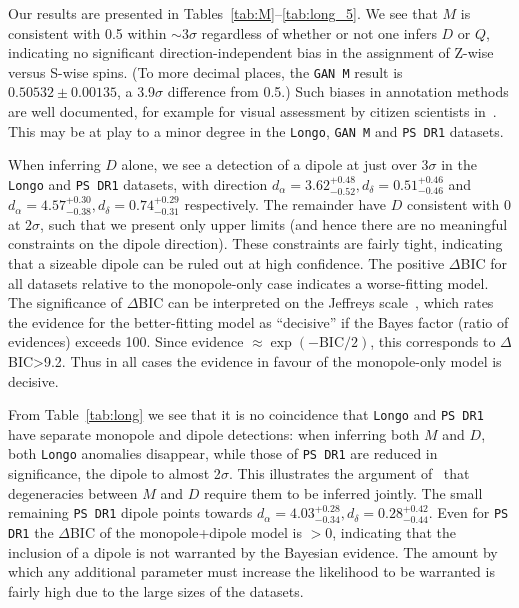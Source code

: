\documentclass[fleqn,usenatbib,nofootinbib]{mnras}
\newcommand{\hd}[1]{{\color{red}\textbf{HD: #1}}}
\begin{document}

Our results are presented in Tables~\ref{tab:M}--\ref{tab:long_5}. We see that $M$ is consistent with 0.5 within $\sim$3$\sigma$ regardless of whether or not one infers $D$ or $Q$, indicating no significant direction-independent bias in the assignment of Z-wise versus S-wise spins. (To more decimal places, the \texttt{GAN M} result is $0.50532\pm0.00135$, a 3.9$\sigma$ difference from 0.5.) Such biases in annotation methods are well documented, for example for visual assessment by citizen scientists in~\citet{Land, 2009MNRAS.392.1225S, 2017MNRAS.466.3928H}.
This may be at play to a minor degree in the \texttt{Longo}, \texttt{GAN M} and \texttt{PS DR1} datasets.

When inferring $D$ alone, we see a detection of a dipole at just over $3\sigma$ in the \texttt{Longo} and \texttt{PS DR1} datasets, with direction $d_{\alpha}=3.62^{+0.48}_{-0.52}, d_{\delta}=0.51^{+0.46}_{-0.46}$ and $d_{\alpha}=4.57^{+0.30}_{-0.38}, d_{\delta}=0.74^{+0.29}_{-0.31}$ respectively. The remainder have $D$ consistent with 0 at $2\sigma$, such that we present only upper limits (and hence there are no meaningful constraints on the dipole direction). These constraints are fairly tight, indicating that a sizeable dipole can be ruled out at high confidence. The positive $\Delta$BIC for all datasets relative to the monopole-only case indicates a worse-fitting model. The significance of $\Delta$BIC can be interpreted on the Jeffreys scale~\citep{Jeffreys}, which rates the evidence for the better-fitting model as ``decisive'' if the Bayes factor (ratio of evidences) exceeds 100. Since evidence $\approx\exp(-\text{BIC}/2)$, this corresponds to $\Delta$BIC>9.2. Thus in all cases the evidence in favour of the monopole-only model is decisive.

From Table~\ref{tab:long} we see that it is no coincidence that \texttt{Longo} and \texttt{PS DR1} have separate monopole and dipole detections: when inferring both $M$ and $D$, both \texttt{Longo} anomalies disappear, while those of \texttt{PS DR1} are reduced in significance, the dipole to almost 2$\sigma$. This illustrates the argument of~\citet{Land} that degeneracies between $M$ and $D$ require them to be inferred jointly. The small remaining \texttt{PS DR1} dipole points towards $d_{\alpha}=4.03^{+0.28}_{-0.34}, d_{\delta}=0.28^{+0.42}_{-0.44}$. Even for \texttt{PS DR1} the $\Delta$BIC of the monopole+dipole model is $>0$, indicating that the inclusion of a dipole is not warranted by the Bayesian evidence. The amount by which any additional parameter must increase the likelihood to be warranted is fairly high due to the large sizes of the datasets.
\end{document}
